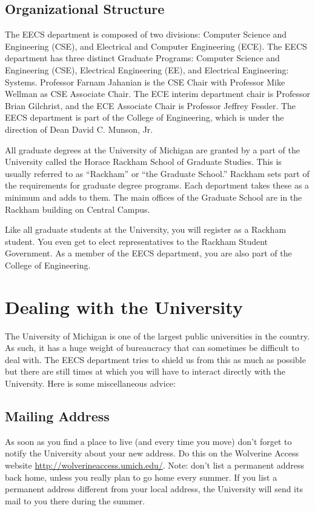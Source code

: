 \documentclass[11pt]{article}
\begin{document}
\subsection{Organizational Structure}
\label{sec-3_5}

The EECS department is composed of two divisions:  Computer Science
and Engineering (CSE), and Electrical and Computer Engineering (ECE).
The EECS department has three distinct Graduate Programs:  Computer
Science and Engineering (CSE), Electrical Engineering (EE), and
Electrical Engineering: Systems. Professor Farnam Jahanian is the CSE
Chair with Professor Mike Wellman as CSE Associate Chair.  The ECE
interim department chair is Professor Brian Gilchrist, and the ECE
Associate Chair is Professor Jeffrey Fessler.  The EECS department is
part of the College of Engineering, which is under the direction of
Dean David C. Munson, Jr.

All graduate degrees at the University of Michigan are granted by a
part of the University called the Horace Rackham School of Graduate
Studies.  This is usually referred to as “Rackham” or “the Graduate
School.”  Rackham sets part of the requirements for graduate degree
programs.  Each department takes these as a minimum and adds to them.
The main offices of the Graduate School are in the Rackham building on
Central Campus.

Like all graduate students at the University, you will register as a
Rackham student.  You even get to elect representatives to the Rackham
Student Government.  As a member of the EECS department, you are also
part of the College of Engineering.

\newpage
\section{Dealing with the University}
\label{sec-4}

The University of Michigan is one of the largest public universities
in the country.  As such, it has a huge weight of bureaucracy that can
sometimes be difficult to deal with.  The EECS department tries to
shield us from this as much as possible but there are still times at
which you will have to interact directly with the University.  Here is
some miscellaneous advice:
\subsection{Mailing Address}
\label{sec-4_1}

As soon as you find a place to live (and every time you move) don't
forget to notify the University about your new address. Do this on the
Wolverine Access website \href{http://wolverineaccess.umich.edu/}{http://wolverineaccess.umich.edu/}.  Note:
don't list a permanent address back home, unless you really plan to go
home every summer.  If you list a permanent address different from
your local address, the University will send its mail to you there
during the summer.
\end{document}
